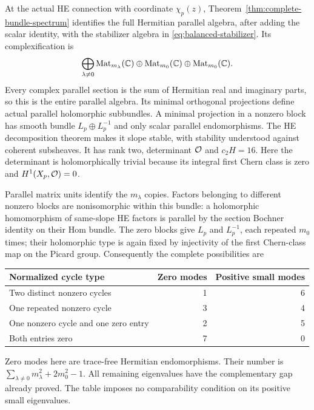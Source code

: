 At the actual HE connection with coordinate $\chi_p(z)$,
Theorem~\ref{thm:complete-bundle-spectrum} identifies the
full Hermitian parallel algebra, after adding the scalar
identity, with the stabilizer algebra in
\eqref{eq:balanced-stabilizer}. Its complexification is
\begin{equation}\label{eq:parallel-matrix-algebra}
 \bigoplus_{\lambda\ne0}\operatorname{Mat}_{m_\lambda}(\mathbb C)
       \oplus\operatorname{Mat}_{m_0}(\mathbb C)
       \oplus\operatorname{Mat}_{m_0}(\mathbb C).
\end{equation}
Every complex parallel section is the sum of Hermitian
real and imaginary parts, so this is the entire parallel
algebra. Its minimal orthogonal projections define actual
parallel holomorphic subbundles. A minimal projection in
a nonzero block has smooth bundle $L_p\oplus L_p^{-1}$
and only scalar parallel endomorphisms. The HE decomposition
theorem \cite[Theorem 5.8.3 and Proposition 5.7.6]{Kobayashi}
makes it slope stable, with stability understood against
coherent subsheaves. It has rank two, determinant $\mathcal O$
and $c_2H=16$. Here the determinant is holomorphically
trivial because its integral first Chern class is zero
and $H^1(X_p,\mathcal O)=0$.

Parallel matrix units identify the $m_\lambda$ copies.
Factors belonging to different nonzero blocks are
nonisomorphic within this bundle: a holomorphic
homomorphism of same-slope HE factors is parallel by
the section Bochner identity on their Hom bundle.
The zero blocks give $L_p$ and $L_p^{-1}$, each repeated
$m_0$ times; their holomorphic type is again fixed by
injectivity of the first Chern-class map on the Picard
group. Consequently the complete possibilities are
\begin{center}
\begin{tabular}{lrr}
\toprule
Normalized cycle type & Zero modes & Positive small modes\\
\midrule
Two distinct nonzero cycles & 1 & 6\\
One repeated nonzero cycle & 3 & 4\\
One nonzero cycle and one zero entry & 2 & 5\\
Both entries zero & 7 & 0\\
\bottomrule
\end{tabular}
\end{center}
Zero modes here are trace-free Hermitian endomorphisms.
Their number is $\sum_{\lambda\ne0}m_\lambda^2+2m_0^2-1$.
All remaining eigenvalues have the complementary gap
already proved. The table imposes no comparability
condition on its positive small eigenvalues.

